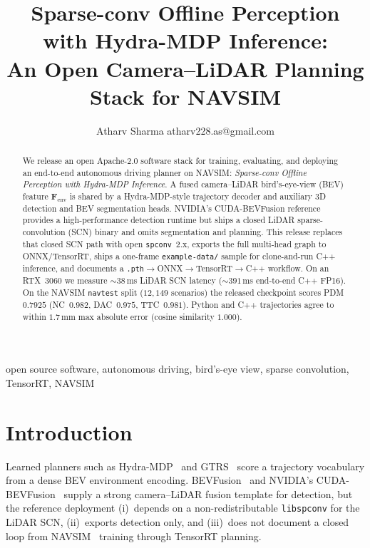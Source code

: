 \documentclass[twoside,11pt]{article}
\begin{document}
\title{Sparse-conv Offline Perception with Hydra-{MDP} Inference:\\
An Open Camera--LiDAR Planning Stack for {NAVSIM}}

\author{\name Atharv Sharma \email atharv228.as@gmail.com}


\maketitle

\begin{abstract}
We release an open Apache-2.0 software stack for training, evaluating, and deploying an end-to-end autonomous driving planner on NAVSIM: \emph{Sparse-conv Offline Perception with Hydra-{MDP} Inference}. A fused camera--LiDAR bird's-eye-view (BEV) feature $\mathbf{F}_{\mathrm{env}}$ is shared by a Hydra-MDP-style trajectory decoder and auxiliary 3D detection and BEV segmentation heads. NVIDIA's CUDA-BEVFusion reference provides a high-performance detection runtime but ships a closed LiDAR sparse-convolution (SCN) binary and omits segmentation and planning. This release replaces that closed SCN path with open \texttt{spconv}~2.x, exports the full multi-head graph to ONNX/TensorRT, ships a one-frame \texttt{example-data/} sample for clone-and-run C++ inference, and documents a \texttt{.pth}$\to$ONNX$\to$TensorRT$\to$C++ workflow. On an RTX~3060 we measure ${\sim}38$\,ms LiDAR SCN latency (${\sim}391$\,ms end-to-end C++ FP16). On the NAVSIM \texttt{navtest} split ($12{,}149$ scenarios) the released checkpoint scores PDM~$0.7925$ (NC~$0.982$, DAC~$0.975$, TTC~$0.981$). Python and C++ trajectories agree to within $1.7$\,mm max absolute error (cosine similarity $1.000$).
\end{abstract}

\begin{keywords}
open source software, autonomous driving, bird's-eye view, sparse convolution, TensorRT, NAVSIM
\end{keywords}

\section{Introduction}
\label{sec:intro}

Learned planners such as Hydra-MDP~\cite{hydramdp2024} and GTRS~\cite{gtrs2024} score a trajectory vocabulary from a dense BEV environment encoding. BEVFusion~\cite{liu2023bevfusion} and NVIDIA's CUDA-BEVFusion~\cite{nvidia2022cudabevfusion} supply a strong camera--LiDAR fusion template for detection, but the reference deployment (i)~depends on a non-redistributable \texttt{libspconv} for the LiDAR SCN, (ii)~exports detection only, and (iii)~does not document a closed loop from NAVSIM~\cite{dauner2024navsim} training through TensorRT planning.
\end{document}
